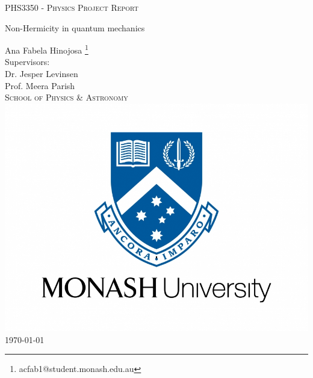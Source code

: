 \documentclass[10pt, a4paper, singlespacing, headsepline]{report}
\begin{document}
\begin{titlepage}
\begin{center}


\vspace{0.5cm}
\textsc{PHS3350 - Physics Project Report} \\
\vspace{2.5cm}

{\Huge Non-Hermicity in quantum mechanics}
\vspace{3cm}

{\LARGE Ana Fabela Hinojosa \footnote{acfab1@student.monash.edu.au}} \\
\vspace{0.4cm}
{\Large Supervisors:\\ Dr. Jesper Levinsen \\ Prof. Meera Parish \\}
\textsc{School of Physics \& Astronomy} \\
\vspace{3cm}
\includegraphics[scale=0.2]{logo.jpg} \\ %
\vspace{3cm}
{\LARGE \today}\\
\vspace{0.5cm}
\end{center}
\end{titlepage}

\end{document}
